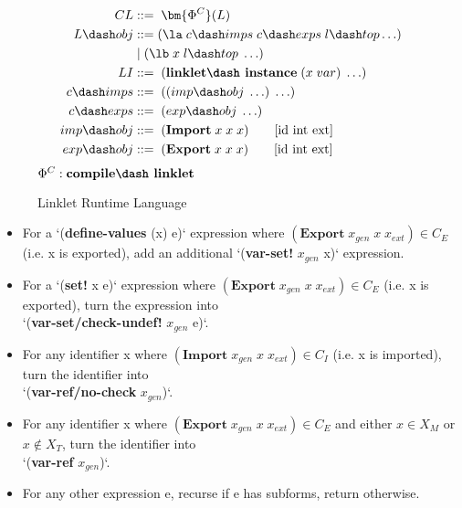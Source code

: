 \begin{wrapfigure}[14]{r}{0.45\textwidth}
  \vspace{-0.9cm}
  \small
  \begin{mdframed}
    \begin{align*}
      CL             &::=\; \bm{\Phi^C}(L)\\
      L\dash obj     &::= (\la\; c\dash imps \; c\dash exps \; l\dash top \ldots)\\
      \;           &\;|\; (\lb\; x\; l\dash top\; \ldots) \\
      LI             &::=\; (\textbf{linklet\dash instance}\; (x\; var)\; \ldots) \\
      c\dash imps    &::=\; ((imp\dash obj\; \ldots)\; \ldots)\\
      c\dash exps    &::=\; (exp\dash obj\; \ldots)\\
      imp\dash obj   &::=\; (\textbf{Import}\; x\; x\; x) \tag*{[id int ext]} \\
      exp\dash obj   &::=\; (\textbf{Export}\; x\; x\; x) \tag*{[id int ext]} \\
    \end{align*}
    \hfill \footnotesize $\Phi^C : \textbf{compile\dash linklet}$
    \caption{Linklet Runtime Language}
    \label{fig:linklet-runtime}
  \end{mdframed}
\end{wrapfigure}


\begin{itemize}
  \small
\item For a `(\textbf{define-values} (x) e)` expression where $(\textbf{Export}\; x_{gen}\; x\; x_{ext}) \in \mathit{C_E}$ (i.e. x is exported), add an additional `(\textbf{var-set!} $x_{gen}$ x)` expression.
\item For a `(\textbf{set!} x e)` expression where $(\textbf{Export}\; x_{gen}\; x\; x_{ext}) \in \mathit{C_E}$ (i.e. x is exported), turn the expression into \\ `(\textbf{var-set/check-undef!} $x_{gen}$ e)`.
\item For any identifier x where $(\textbf{Import}\; x_{gen}\; x\; x_{ext}) \in \mathit{C_I}$  (i.e. x is imported), turn the identifier into \\ `(\textbf{var-ref/no-check} $x_{gen}$)`.
\item For any identifier x where $(\textbf{Export}\; x_{gen}\; x\; x_{ext}) \in \mathit{C_E}$ and either $x \in \mathit{X_M}$ or $x \notin \mathit{X_T}$, turn the identifier into \\ `(\textbf{var-ref} $x_{gen}$)`.
\item For any other expression e, recurse if e has subforms, return otherwise.
\end{itemize}

